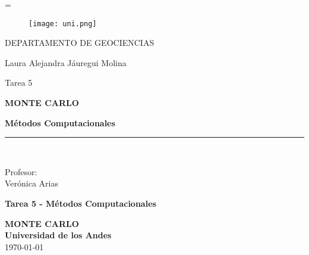 =\documentclass[12pts,letterpaper]{article}
\begin{document}
\begin{titlepage}

\begin{center}
\vspace*{-1in}
\begin{figure}[htb]
\begin{center}
\texttt{[image: uni.png]}
\end{center}
\end{figure}

\vspace*{0.15in}
DEPARTAMENTO DE GEOCIENCIAS \\
\vspace*{0.6in}
\begin{large}
Laura Alejandra Jáuregui Molina\\
\end{large}
\vspace*{0.2in}
\begin{large}
Tarea 5 \\
\end{large}
\vspace*{0.2in}
\begin{Large}
\textbf{MONTE CARLO} \\
\end{Large}
\begin{Large}
\textbf{Métodos Computacionales}\\

\end{Large}

\vspace*{0.3in}
\rule{80mm}{0.1mm}\\
\vspace*{0.1in}
\begin{large}
Profesor: \\
Verónica Arias\\
\end{large}
\end{center}

\end{titlepage}
\renewcommand{\labelitemi}{$\checkmark$}

\begin{center}

\textbf{\LARGE{Tarea 5 - Métodos Computacionales}}\\
\hrulefill
	\vspace{4mm}
	
\textbf{\large{MONTE CARLO}}\\

\textbf{\large{Universidad de los Andes}}\\
	\today
\end{center}
\vspace{1mm}
\end{document}
